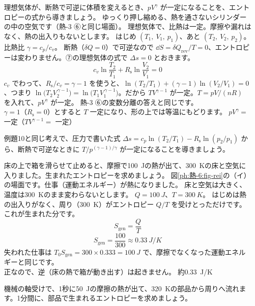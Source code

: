 \label{ph:熱-6:ex10}
\begin{phreidai}
理想気体が、断熱で可逆に体積を変えるとき、$pV^{\gamma}$ が一定になることを、エントロピーの式から導きましょう。
\phbamen
ゆっくり押し縮める、熱を通さないシリンダーの中の空気です（熱-3 ⑥と同じ場面）。
\phmushi
理想気体で、比熱は一定。摩擦や漏れはなく、熱の出入りもないとします。
\phzu
はじめ $(T_1,\ V_1,\ p_1)$、あと $(T_2,\ V_2,\ p_2)$。比熱比 $\gamma=c_p/c_v$。
\phriyu
断熱（$\delta Q=0$）で可逆なので $\dd S=\delta Q_{\mathrm{rev}}/T=0$、エントロピーは変わりません。⑦の理想気体の式で $\Delta s=0$ とおきます。
\phtateru
\[c_v\ln\frac{T_2}{T_1}+R_{\mathrm s}\ln\frac{V_2}{V_1}=0\]
\phtoku
$c_v$ でわって、$R_{\mathrm s}/c_v=\gamma-1$ を使うと、$\ln(T_2/T_1)+(\gamma-1)\ln(V_2/V_1)=0$、つまり $\ln\bigl(T_2V_2^{\,\gamma-1}\bigr)=\ln\bigl(T_1V_1^{\,\gamma-1}\bigr)$。だから $TV^{\gamma-1}$ が一定。$T=pV/(nR)$ を入れて、$pV^{\gamma}$ が一定。
\phtashikame
熱-3 ⑥の変数分離の答えと同じです。\\
$\gamma=1$（$R_{\mathrm s}=0$）とすると $T$ 一定になり、形の上では等温にもどります。
\kotae $pV^{\gamma}=$ 一定（$TV^{\gamma-1}=$ 一定）
\end{phreidai}
\begin{jibun}
例題10と同じ考えで、圧力で書いた式 $\Delta s=c_p\ln(T_2/T_1)-R_{\mathrm s}\ln(p_2/p_1)$ から、断熱で可逆なときに $T/p^{(\gamma-1)/\gamma}$ が一定になることを導きましょう。
\end{jibun}

\label{ph:熱-6:ex11}
\begin{phreidai}[摩擦の熱で生まれるエントロピー]
床の上で箱を滑らせて止めると、摩擦で\qty{100}{J}の熱が出て、\qty{300}{K}の床と空気に入りました。生まれたエントロピーを求めましょう。
\phbamen
図\ref{ph:熱-6:fig-rei}の（イ）の場面です。仕事（運動エネルギー）が熱になりました。
\phmushi
床と空気は大きく、温度は\qty{300}{K}のまま変わらないとします。
\phzu
$Q=\qty{100}{J}$、$T=\qty{300}{K}$。
\phriyu
はじめは熱の出入りがなく、周り（\qty{300}{K}）がエントロピー $Q/T$ を受けとっただけです。これが生まれた分です。
\phtateru
\[S_{\mathrm{gen}}=\frac{Q}{T}\]
\phtoku
\[S_{\mathrm{gen}}=\frac{100}{300}\approx\qty{0.33}{J/K}\]
\phtashikame
失われた仕事は $T_0S_{\mathrm{gen}}=300\times0.333=\qty{100}{J}$ で、摩擦でなくなった運動エネルギーと同じです。\\
正なので、逆（床の熱で箱が動き出す）は起きません。
\kotae 約\qty{0.33}{J/K}
\end{phreidai}
\begin{jibun}
機械の軸受けで、1秒に\qty{50}{J}の摩擦の熱が出て、\qty{320}{K}の部品から周りへ流れます。1分間に、部品で生まれるエントロピーを求めましょう。
\end{jibun}

